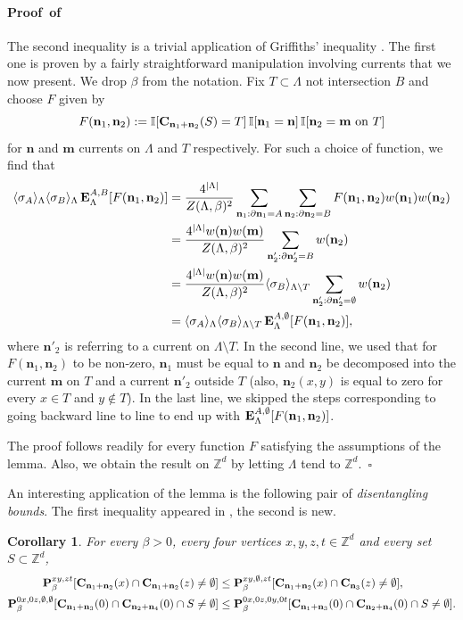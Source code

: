\documentclass[a4paper,oneside,11pt]{article}
\def\Z{\mathbb{Z}}                          %
\newtheorem{corollary}[theorem]{Corollary}
\newcommand{\be}[1]{\begin{equation}\label{#1}}
\newcommand{\ee}{\end{equation}}
\numberwithin{equation}{section}
\numberwithin{equation}{section}
\numberwithin{equation}{section}
\newenvironment{proof}[1][\relax]%
  {\paragraph{Proof\ifx#1\relax\else~of #1\fi}}%
  {~\hfill$\square$\par\bigskip}
\newcommand{\bbZ}{\mathbb{Z}}
\def\Z{\mathbb{Z}}                          %
\def\be{\begin{equation}}
\def\ee{\end{equation}}
\newcommand{\n}{\mathbf{n}}
\newcommand{\m}{\mathbf m}
\begin{document}
\begin{proof}The second inequality is a trivial application of Griffiths' inequality \cite{Gri67}. The first one is proven by a fairly straightforward manipulation involving currents that we now present.  We drop $\beta$ from the notation. Fix $T\subset\Lambda$ not intersection $B$ and choose $F$ given by
\be
F(\n_1,\n_2):=\mathbb I[{\bf C}_{\n_1+\n_2}(S)=T]\,\mathbb I[\n_1=\n]\,\mathbb I[\n_2=\m\text{ on }T]\ee for $\n$ and $\m$ currents on $\Lambda$ and $T$ respectively. For such a choice of function, we find that
\begin{align}
\langle\sigma_A\rangle_\Lambda\langle\sigma_B\rangle_\Lambda\,{\bf E}^{A,B}_\Lambda[F(\n_1,\n_2)]&=\frac{4^{|\Lambda|}}{Z(\Lambda,\beta)^2}\sum_{\n_1:\partial\n_1=A}\sum_{\n_2:\partial\n_2=B}F(\n_1,\n_2)w(\n_1)w(\n_2)\nonumber\\
&=\frac{4^{|\Lambda|}w(\n)w(\m)}{Z(\Lambda,\beta)^2}\sum_{\n_2':\partial\n_2'=B}w(\n_2)\nonumber\\
&=\frac{4^{|\Lambda|}w(\n)w(\m)}{Z(\Lambda,\beta)^2}\langle\sigma_B\rangle_{\Lambda\setminus T}\sum_{\n_2':\partial\n'_2=\emptyset}w(\n_2)\nonumber\\
&=\langle\sigma_A\rangle_\Lambda\langle\sigma_B\rangle_{\Lambda\setminus T}\,{\bf E}^{A,\emptyset}_\Lambda[F(\n_1,\n_2)],
\end{align}
where $\n'_2$ is referring to a current on $\Lambda\setminus T$. In the second line, we used that for $F(\n_1,\n_2)$ to be non-zero, $\n_1$ must be equal to $\n$ and $\n_2$ be decomposed into the current $\m$ on $T$ and a current $\n'_2$ outside $T$ (also, $\n_2(x,y)$ is equal to zero for every $x\in T$ and $y\notin T$). In the last line, we skipped the steps corresponding to going backward line to line to end up with ${\bf E}^{A,\emptyset}_\Lambda[F(\n_1,\n_2)]$.

The proof follows readily for every function $F$ satisfying the assumptions of the lemma. Also, we obtain the result on $\bbZ^d$ by letting $\Lambda$ tend to $\Z^d$.\end{proof}

An interesting application of the lemma is the following pair of \emph{disentangling bounds}. The first inequality appeared in \cite[Proposition  5.2]{Aiz82}, the second is new.
\begin{corollary}\label{cor:1} \label{prop:indep}\label{lem:Aizenman}
For every $\beta>0$, every four vertices $x,y,z,t\in\bbZ^d$ and every set $S\subset\bbZ^d$, 
\begin{align}{\bf P}^{xy,zt}_\beta[{\bf C}_{\n_1+\n_2}(x)\cap{\bf C}_{\n_1+\n_2}(z)\ne \emptyset]&\le{\bf P}^{xy,\emptyset,zt}_\beta[{\bf C}_{\n_1+\n_2}(x)\cap{\bf C}_{\n_3}(z)\ne \emptyset],\\
{\bf P}^{0x,0z,\emptyset,\emptyset}_\beta[{\bf C}_{\n_1+\n_3}(0)\cap{\bf C}_{\n_2+\n_4}(0)\cap S\ne \emptyset]&\le{\bf P}^{0x,0z,0y,0t}_\beta[{\bf C}_{\n_1+\n_3}(0)\cap{\bf C}_{\n_2+\n_4}(0)\cap S\ne \emptyset].
\end{align}
\end{corollary}
\end{document}

